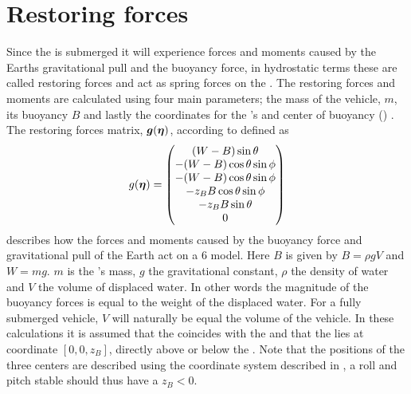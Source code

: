 \section{Restoring forces}
Since the \abbrROV is submerged it will experience forces and moments caused by the Earths gravitational pull and the buoyancy force, in hydrostatic terms these are called restoring forces and act as spring forces on the \abbrROV \citep{fossen2011}. The restoring forces and moments are calculated using four main parameters; the mass of the vehicle, $m$, its buoyancy $B$ and lastly the coordinates for the \abbrROV's \abbrCG and center of buoyancy (\abbrCB) \citep{fossen2011}.
The restoring forces matrix, $\boldsymbol{g}(\boldsymbol{\eta})$, according to \citet[p.60]{fossen2011} defined as
\begin{equation}
    g(\boldsymbol{\eta}) =
    \begin{pmatrix}
        (W - B) \sin \theta\\
    -(W - B) \cos \theta \sin \phi\\
    -(W - B) \cos \theta \sin \phi\\
    -z_B B \cos \theta \sin \phi\\
    -z_B B \sin \theta\\
    0\\
    \end{pmatrix}
\end{equation}
describes how the forces and moments caused by the buoyancy force and gravitational pull of the Earth act on a 6 \abbrDOF model. Here $B$ is given by $B = \rho g V$ and $W = m g$. $m$ is the \abbrROV's mass, $g$ the gravitational constant, $\rho$ the density of water and $V$ the volume of displaced water. In other words the magnitude of the buoyancy forces is equal to the weight of the displaced water. For a fully submerged vehicle, $V$ will naturally be equal the volume of the vehicle.
In these calculations it is assumed that the \abbrCG coincides with the \abbrCO and that the \abbrCB lies at coordinate $[0, 0, z_B]$, directly above or below the \abbrCO. Note that the positions of the three centers are described using the coordinate system described in , a roll and pitch stable \abbrROV should thus have a $z_B < 0$.


